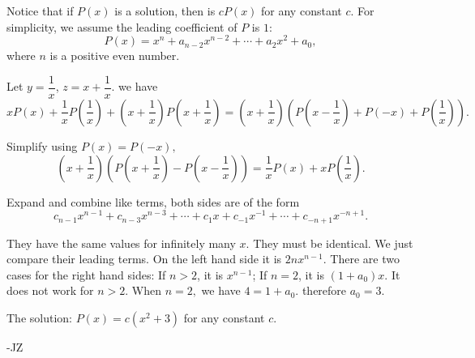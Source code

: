 \begin{enumerate}
 Notice that if $P(x)$ is a solution,  then is $cP(x)$ for any constant $c.$ For simplicity, we assume the leading coefficient of $P$ is $1$: 
 \[P(x)=x^n+a_{n-2}x^{n-2}+\cdots +a_2x^2+a_0,\] where $n$ is a positive even number.

 Let $y=\dfrac{1}{x}$, $z=x+\dfrac{1}{x}.$ we have 
 \[xP(x)+\dfrac{1}{x}P\left (\dfrac{1}{x}\right )+\left ( x+\dfrac{1}{x}\right ) P\left ( x+\dfrac{1}{x}\right ) =\left (x+\dfrac{1}{x}\right )\left ( P\left (x-\dfrac{1}{x}\right )+P(-x)+P\left (\dfrac{1}{x}\right )\right ).\]

 Simplify using $P(x)=P(-x),$
 \[\left (x+\dfrac{1}{x}\right ) \left (P\left (x+\dfrac{1}{x}\right )-P\left (x-\dfrac{1}{x}\right )\right )=\dfrac{1}{x}P(x)+xP\left (\dfrac{1}{x}\right ).\]

 Expand and combine like terms, both sides are of the form 
 \[c_{n-1}x^{n-1}+c_{n-3}x^{n-3}+\cdots+c_1x+c_{-1}x^{-1}+\cdots+c_{-n+1}x^{-n+1}.\]

 They have the same values for infinitely many $x.$ They must be identical. We just compare their leading terms. On the left hand side it is $2nx^{n-1}$. There are two cases for the right hand sides: If $n>2$, it is $x^{n-1}$; If $n=2$, it is $(1+a_0)x.$ It does not work for $n>2.$ When $n=2,$ we have $4=1+a_0.$ therefore $a_0=3.$

 The solution: $P(x)=c(x^2+3)$ for any constant $c.$ 

 -JZ

 


\end{enumerate}